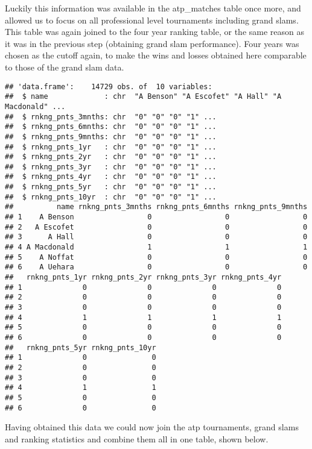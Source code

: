 \documentclass[]{article}
\begin{document}
Luckily this information was available in the atp\_matches table once
more, and allowed us to focus on all professional level tournaments
including grand slams. This table was again joined to the four year
ranking table, or the same reason as it was in the previous step
(obtaining grand slam performance). Four years was chosen as the cutoff
again, to make the wins and losses obtained here comparable to those of
the grand slam data.

\begin{verbatim}
## 'data.frame':    14729 obs. of  10 variables:
##  $ name             : chr  "A Benson" "A Escofet" "A Hall" "A Macdonald" ...
##  $ rnkng_pnts_3mnths: chr  "0" "0" "0" "1" ...
##  $ rnkng_pnts_6mnths: chr  "0" "0" "0" "1" ...
##  $ rnkng_pnts_9mnths: chr  "0" "0" "0" "1" ...
##  $ rnkng_pnts_1yr   : chr  "0" "0" "0" "1" ...
##  $ rnkng_pnts_2yr   : chr  "0" "0" "0" "1" ...
##  $ rnkng_pnts_3yr   : chr  "0" "0" "0" "1" ...
##  $ rnkng_pnts_4yr   : chr  "0" "0" "0" "1" ...
##  $ rnkng_pnts_5yr   : chr  "0" "0" "0" "1" ...
##  $ rnkng_pnts_10yr  : chr  "0" "0" "0" "1" ...
##          name rnkng_pnts_3mnths rnkng_pnts_6mnths rnkng_pnts_9mnths
## 1    A Benson                 0                 0                 0
## 2   A Escofet                 0                 0                 0
## 3      A Hall                 0                 0                 0
## 4 A Macdonald                 1                 1                 1
## 5    A Noffat                 0                 0                 0
## 6    A Uehara                 0                 0                 0
##   rnkng_pnts_1yr rnkng_pnts_2yr rnkng_pnts_3yr rnkng_pnts_4yr
## 1              0              0              0              0
## 2              0              0              0              0
## 3              0              0              0              0
## 4              1              1              1              1
## 5              0              0              0              0
## 6              0              0              0              0
##   rnkng_pnts_5yr rnkng_pnts_10yr
## 1              0               0
## 2              0               0
## 3              0               0
## 4              1               1
## 5              0               0
## 6              0               0
\end{verbatim}

Having obtained this data we could now join the atp tournaments, grand
slams and ranking statistics and combine them all in one table, shown
below.
\end{document}
